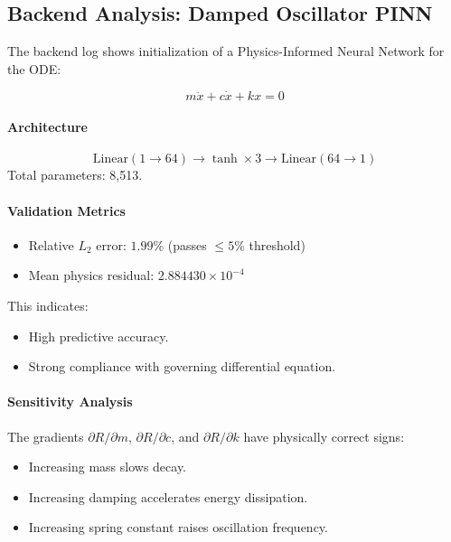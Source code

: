 \documentclass[12pt,singleside,a4paper]{article}
\begin{document}
\subsection{Backend Analysis: Damped Oscillator PINN}

The backend log shows initialization of a Physics-Informed Neural Network for the ODE:

\[
m\ddot{x} + c\dot{x} + kx = 0
\]

\paragraph{Architecture}
\[
\text{Linear}(1 \rightarrow 64) \rightarrow \tanh \times 3 \rightarrow \text{Linear}(64 \rightarrow 1)
\]
Total parameters: 8,513.

\paragraph{Validation Metrics}
\begin{itemize}
    \item Relative $L_2$ error: $1.99\%$ (passes $\leq 5\%$ threshold)
    \item Mean physics residual: $2.884430 \times 10^{-4}$
\end{itemize}

This indicates:
\begin{itemize}
    \item High predictive accuracy.
    \item Strong compliance with governing differential equation.
\end{itemize}

\paragraph{Sensitivity Analysis}

The gradients $\partial R/\partial m$, $\partial R/\partial c$, and $\partial R/\partial k$ have physically correct signs:

\begin{itemize}
    \item Increasing mass slows decay.
    \item Increasing damping accelerates energy dissipation.
    \item Increasing spring constant raises oscillation frequency.
\end{itemize}
\end{document}
